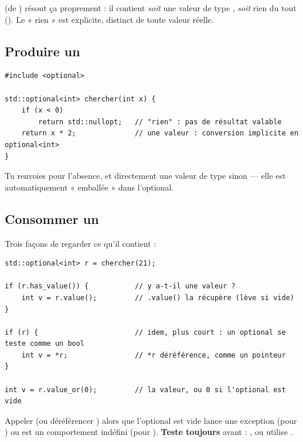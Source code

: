 \documentclass[11pt]{article}
\begin{document}
 (de ) résout ça proprement : il
contient \emph{soit} une valeur de type , \emph{soit} rien du tout
(). Le « rien » est explicite, distinct de toute valeur réelle.

\subsection*{Produire un }

\begin{lstlisting}
#include <optional>

std::optional<int> chercher(int x) {
    if (x < 0)
        return std::nullopt;   // "rien" : pas de résultat valable
    return x * 2;              // une valeur : conversion implicite en optional<int>
}
\end{lstlisting}

Tu renvoies  pour l'absence, et directement une valeur de
type  sinon — elle est automatiquement « emballée » dans l'optional.

\subsection*{Consommer un }

Trois façons de regarder ce qu'il contient :

\begin{lstlisting}
std::optional<int> r = chercher(21);

if (r.has_value()) {           // y a-t-il une valeur ?
    int v = r.value();         // .value() la récupère (lève si vide)
}

if (r) {                       // idem, plus court : un optional se teste comme un bool
    int v = *r;                // *r déréférence, comme un pointeur
}

int v = r.value_or(0);         // la valeur, ou 0 si l'optional est vide
\end{lstlisting}

\begin{piege}
Appeler  (ou déréférencer ) alors que l'optional est
vide lance une exception  (pour )
ou est un comportement indéfini (pour ). \textbf{Teste toujours} avant :
, ou utilise .
\end{piege}
\end{document}
